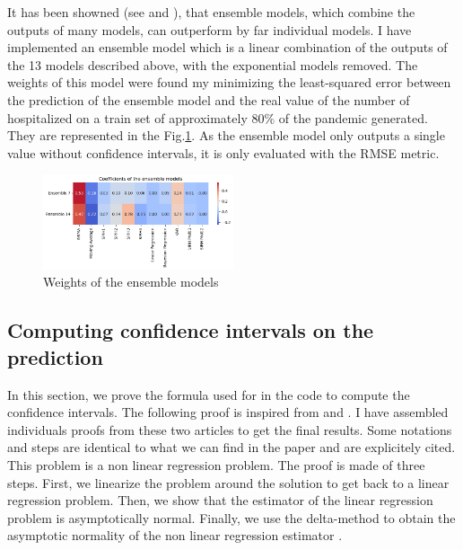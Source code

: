 It has been showned (see \cite{cramer2022evaluation} and \cite{reich2019accuracy}), that ensemble models, which combine the outputs of many models, can outperform by far individual models.
I have implemented an ensemble model which is a linear combination of the outputs of the 13 models described above, with the exponential models removed.
The weights of this model were found my minimizing the least-squared error between the prediction of the ensemble model and the real value of the number of hospitalized on a train set of approximately 80\% of the pandemic generated. 
They are represented in the Fig.\ref{fig:ensemble_weights}.
As the ensemble model only outputs a single value without confidence intervals, it is only evaluated with the RMSE metric. 
\begin{figure}
    \centering
    \includegraphics[width=0.5\textwidth]{figures/esb_coefs.png}
    \caption{Weights of the ensemble models}
    \label{fig:ensemble_weights}
\end{figure}
\subsection{Computing confidence intervals on the prediction}
\label{sec:ci}
In this section, we prove the formula used for in the code to compute the confidence intervals. 
The following proof is inspired from \cite{ruckstuhl2010introduction} and \cite{powellasymptoticsforleastsquares}. 
I have assembled individuals proofs from these two articles to get the final results. 
Some notations and steps are identical to what we can find in the paper and are explicitely cited. \\
This problem is a non linear regression problem. 
The proof is made of three steps. 
First, we linearize the problem around the solution to get back to a linear regression problem. 
Then, we show that the estimator of the linear regression problem is asymptotically normal.
Finally, we use the delta-method to obtain the asymptotic normality of the non linear regression estimator . \\


